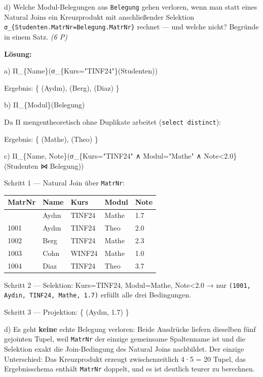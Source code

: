 \documentclass[11pt, a4paper]{article}
\begin{document}
d) Welche Modul-Belegungen aus \texttt{Belegung} gehen verloren, wenn man statt eines Natural Joins ein Kreuzprodukt mit anschließender Selektion \texttt{σ\_\{Studenten.MatrNr=Belegung.MatrNr\}} rechnet — und welche nicht? Begründe in einem Satz. \textit{(6 P)}


\textbf{Lösung:}


a) Π\_\{Name\}(σ\_\{Kurs="TINF24"\}(Studenten))


Ergebnis: \{ (Aydın), (Berg), (Diaz) \}


b) Π\_\{Modul\}(Belegung)


Da Π mengentheoretisch ohne Duplikate arbeitet (\texttt{select distinct}):

Ergebnis: \{ (Mathe), (Theo) \}


c) Π\_\{Name, Note\}(σ\_\{Kurs="TINF24" ∧ Modul="Mathe" ∧ Note<2.0\}(Studenten ⋈ Belegung))


Schritt 1 — Natural Join über \texttt{MatrNr}:



{\small
\begin{tabularx}{\linewidth}{XXXXX}
\hline
\rowcolor{tableheadbg}
{\color{white}\textbf{MatrNr}} & {\color{white}\textbf{Name}} & {\color{white}\textbf{Kurs}} & {\color{white}\textbf{Modul}} & {\color{white}\textbf{Note}} \\[2pt]
\hline
\endhead
\hline
\endfoot
1001 & Aydın & TINF24 & Mathe & 1.7 \\
1001 & Aydın & TINF24 & Theo & 2.0 \\
1002 & Berg & TINF24 & Mathe & 2.3 \\
1003 & Cohn & WINF24 & Mathe & 1.0 \\
1004 & Diaz & TINF24 & Theo & 3.7 \\
\end{tabularx}
}


Schritt 2 — Selektion: Kurs=TINF24, Modul=Mathe, Note<2.0 → nur \texttt{(1001, Aydın, TINF24, Mathe, 1.7)} erfüllt alle drei Bedingungen.


Schritt 3 — Projektion: \{ (Aydın, 1.7) \}


d) Es geht \textbf{keine} echte Belegung verloren: Beide Ausdrücke liefern dieselben fünf gejointen Tupel, weil \texttt{MatrNr} der einzige gemeinsame Spaltenname ist und die Selektion exakt die Join-Bedingung des Natural Joins nachbildet. Der einzige Unterschied: Das Kreuzprodukt erzeugt zwischenzeitlich 4·5 = 20 Tupel, das Ergebnisschema enthält \texttt{MatrNr} doppelt, und es ist deutlich teurer zu berechnen.
\end{document}

